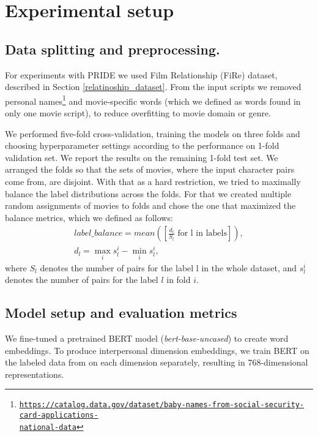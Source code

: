 \section{Experimental setup}

\subsection{Data splitting and preprocessing.} 
For experiments with PRIDE we used Film Relationship (FiRe) dataset, described in Section \ref{relatinoship_dataset}.
From the input scripts we removed personal names\footnote{
\href{https://catalog.data.gov/dataset/baby-names-from-social-security-card-applications-national-data}{\texttt{\justify https://catalog.data.gov/dataset/baby-names-from-social-security-card-applications-\\national-data}}} and movie-specific words (which we defined as words found in only one movie script), to reduce overfitting to movie domain or genre.

We performed five-fold cross-validation, training the models on three folds and choosing hyperparameter settings according to the performance on 1-fold validation set. We report the results on the remaining 1-fold test set. We arranged the folds so that the sets of movies, where the input character pairs come from, are disjoint. With that as a hard restriction, we tried to maximally balance the label distributions across the folds. For that we created multiple random assignments of movies to folds and chose the one that maximized the balance metrics, which we defined as follows:
\begin{gather*}
    label\_balance = mean([\frac{d_l}{S_l} \mbox{ for l in labels}]), \\
    d_l = \max_{i}s^i_l - \min_{i}s^i_l, 
\end{gather*}
where $S_l$ denotes the number of pairs for the label l in the whole dataset, and $s^i_l$ denotes the number of pairs for the label $l$ in fold $i$.


\subsection{Model setup and evaluation metrics}

We fine-tuned a pretrained BERT model (\textit{bert-base-uncased}) to create word embeddings. To produce interpersonal dimension embeddings, we train BERT on the labeled data from \citet{rashid2018characterizing} on each dimension separately, resulting in 768-dimensional representations.

